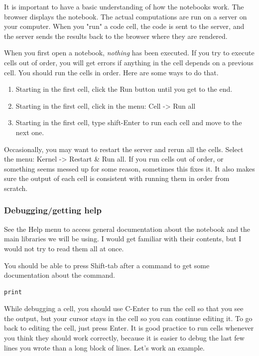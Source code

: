 \documentclass[11pt]{article}
\begin{document}
It is important to have a basic understanding of how the notebooks work. The browser displays the notebook. The actual computations are run on a server on your computer. When you "run" a code cell, the code is sent to the server, and the server sends the results back to the browser where they are rendered.

When you first open a notebook, \emph{nothing} has been executed. If you try to execute cells out of order, you will get errors if anything in the cell depends on a previous cell. You should run the cells in order. Here are some ways to do that.

\begin{enumerate}
\item Starting in the first cell, click the Run button until you get to the end.
\item Starting in the first cell, click in the menu: Cell -> Run all
\item Starting in the first cell, type shift-Enter to run each cell and move to the next one.
\end{enumerate}

Occasionally, you may want to restart the server and rerun all the cells. Select the menu: Kernel -> Restart \& Run all. If you run cells out of order, or something seems messed up for some reason, sometimes this fixes it. It also makes sure the output of each cell is consistent with running them in order from scratch.

\subsubsection{Debugging/getting help}
\label{sec:org01ec868}

See the Help menu to access general documentation about the notebook and the main libraries we will be using. I would get familiar with their contents, but I would not try to read them all at once.

You should be able to press Shift-tab after a command to get some documentation about the command.

\begin{verbatim}
print
\end{verbatim}

While debugging a cell, you should use C-Enter to run the cell so that you see the output, but your cursor stays in the cell so you can continue editing it. To go back to editing the cell, just press Enter. It is good practice to run cells whenever you think they should work correctly, because it is easier to debug the last few lines you wrote than a long block of lines. Let's work an example.
\end{document}
